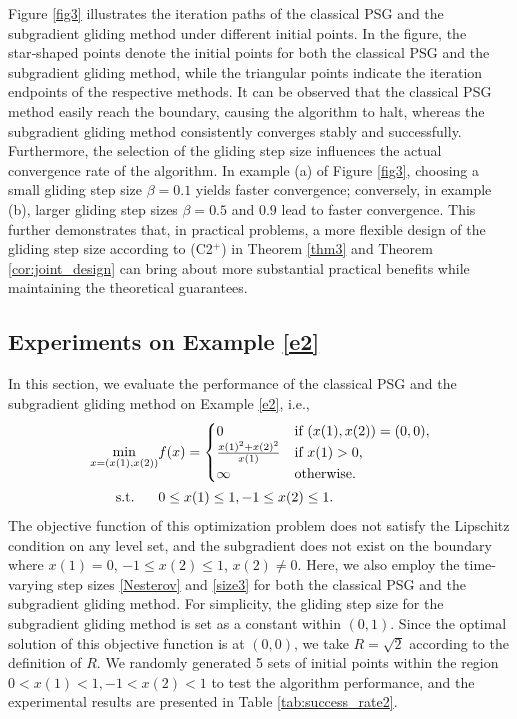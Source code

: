 \documentclass[sn-mathphys]{JORSC-jnl}%
\theoremstyle{thmstyleone}%
\theoremstyle{thmstylethree}%
\def\ST{\songti\rm\relax}
\def\ST{{\rm s.t.}}
\begin{document}
Figure \ref{fig3} illustrates the iteration paths of the classical PSG and the subgradient gliding method under different initial points. In the figure, the star‑shaped points denote the initial points for both the classical PSG and the subgradient gliding method, while the triangular points indicate the iteration endpoints of the respective methods. It can be observed that the classical PSG method easily reach the boundary, causing the algorithm to halt, whereas the subgradient gliding method consistently converges stably and successfully. Furthermore, the selection of the gliding step size influences the actual convergence rate of the algorithm. In example (a) of Figure \ref{fig3}, choosing a small gliding step size $\beta = 0.1$ yields faster convergence; conversely, in example (b), larger gliding step sizes $\beta = 0.5$ and $0.9$ lead to faster convergence. This further demonstrates that, in practical problems, a more flexible design of the gliding step size according to (C2$^+$) in Theorem \ref{thm3} and Theorem \ref{cor:joint_design} can bring about more substantial practical benefits while maintaining the theoretical guarantees.

\subsection{Experiments on Example \ref{e2}}
In this section, we evaluate the performance of the classical PSG and the subgradient gliding method on Example \ref{e2}, i.e.,
\begin{equation}
	\begin{alignedat}{2}
		&\min_{x = (x(1), x(2))} && f(x) = 
		\begin{cases}
			0 & \text{if } (x(1), x(2)) = (0,0), \\
			\frac{x(1)^2 + x(2)^2}{x(1)} & \text{if } x(1) > 0, \\
			\infty & \text{otherwise}.
		\end{cases}\\
		&~~~~~~\ST&&0 \le x(1) \le 1, -1 \le x(2) \le 1.
		\label{m2}
	\end{alignedat}
\end{equation}
The objective function of this optimization problem does not satisfy the Lipschitz condition on any level set, and the subgradient does not exist on the boundary where $x(1)=0$, $-1 \le x(2) \le 1$, $x(2) \neq 0$. Here, we also employ the time-varying step sizes \eqref{Nesterov} and \eqref{size3} for both the classical PSG and the subgradient gliding method. For simplicity, the gliding step size for the subgradient gliding method is set as a constant within $(0,1)$. Since the optimal solution of this objective function is at $(0,0)$, we take $R = \sqrt{2}$ according to the definition of $R$. We randomly generated 5 sets of initial points within the region $0 < x(1) < 1, -1 < x(2) < 1$ to test the algorithm performance, and the experimental results are presented in Table \ref{tab:success_rate2}.
\end{document}
